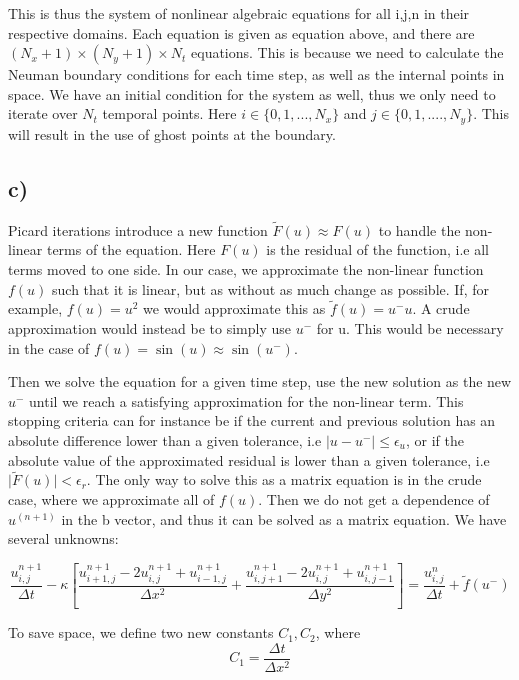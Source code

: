 \documentclass[norsk,a4paper,12pt]{scrartcl}
\begin{document}
This is thus the system of nonlinear algebraic equations for all i,j,n in their respective domains. Each equation is given as equation above, and there are $(N_x+1)\times (N_y+1)\times N_t$ equations. This is because we need to calculate the Neuman boundary conditions for each time step, as well as the internal points in space. We have an initial condition for the system as well, thus we only need to iterate over $N_t$ temporal points. Here $i \in \{0,1,...,N_x\}$ and $j\in \{0, 1, ...., N_y\}$. This will result in the use of ghost points at the boundary.

\subsection{c)}
Picard iterations introduce a new function $\tilde{F}(u) \approx F(u)$ to handle the non-linear terms of the equation. Here $F(u)$ is the residual of the function, i.e all terms moved to one side. In our case, we approximate the non-linear function $f(u)$ such that it is linear, but as without as much change as possible. If, for example, $f(u) = u^2$ we would approximate this as $\tilde{f}(u) = u^-u$. A crude approximation would instead be to simply use $u^-$ for u. This would be necessary in the case of $f(u) = \sin{(u)} \approx \sin{(u^-)}$.\par 
Then we solve the equation for a given time step, use the new solution as the new $u^-$ until we reach a satisfying approximation for the non-linear term. This stopping criteria can for instance be if the current and previous solution has an absolute difference lower than a given tolerance, i.e $\mid u-u^-\mid \leq \epsilon_u$, or if the absolute value of the approximated residual is lower than a given tolerance, i.e $\mid \tilde{F}(u)\mid < \epsilon_r$. The only way to solve this as a matrix equation is in the crude case, where we approximate all of $f(u)$. Then we do not get a dependence of $u^(n+1)$ in the b vector, and thus it can be solved as a matrix equation. We have several unknowns:

\begin{equation}
    \frac{u_{i,j}^{n+1}}{\Delta t}- \kappa \left[ \frac{ u_{i+1,j}^{n+1} -2u_{i,j}^{n+1} + u_{i-1,j}^{n+1}}{\Delta x^2} + \frac{ u_{i,j+1}^{n+1} -2u_{i,j}^{n+1} + u_{i,j-1}^{n+1} }{\Delta y^2} \right]= \frac{u_{i,j}^n}{\Delta t}   + \tilde{f}(u^-)
\end{equation}

To save space, we define two new constants $C_1, C_2$, where 
\begin{equation*}
    C_1 =  \frac{\Delta t}{\Delta x^2}
\end{equation*}
\end{document}
